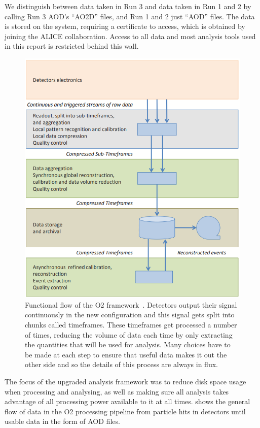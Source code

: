 We distinguish between data taken in Run 3 and data taken in Run 1 and 2 by calling Run 3 AOD's ``AO2D'' files, and Run 1 and 2 just ``AOD'' files. The data is stored on the  system, requiring a certificate to access, which is obtained by joining the ALICE collaboration. Access to all data and most analysis tools used in this report is restricted behind this wall. 

\begin{figure}[h]
    \begin{center}
        \includegraphics[width=.6\textwidth]{Figs/O2_flow.png}
        \caption{Functional flow of the O2 framework~\cite{O2_Upgrade_TDR}. Detectors output their signal continuously in the new configuration and this signal gets split into chunks called timeframes. These timeframes get processed a number of times, reducing the volume of data each time by only extracting the quantities that will be used for analysis. Many choices have to be made at each step to ensure that useful data makes it out the other side and so the details of this process are always in flux.}
        \label{fig:O2_flow}
    \end{center}
\end{figure}

The focus of the upgraded analysis framework was to reduce disk space usage when processing and analysing, as well as making sure all analysis takes advantage of all processing power available to it at all times.  shows the general flow of data in the O2 processing pipeline from particle hits in detectors until usable data in the form of AOD files. 

